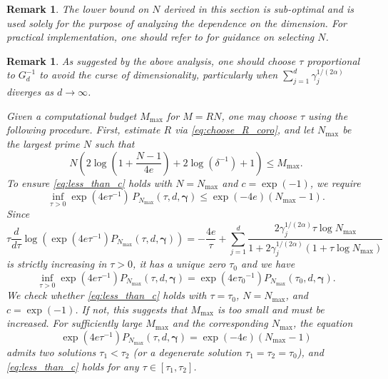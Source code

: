 \documentclass[pdflatex,sn-basic,Numbered]{sn-jnl}%
\newcommand{\bsgamma}{\boldsymbol{\gamma}}
\theoremstyle{thmstyleone}%
\newtheorem{remark}[theorem]{Remark}
\theoremstyle{thmstyletwo}%
\begin{document}
\begin{remark}
    The lower bound on $N$ derived in this section is sub-optimal and is used solely for the purpose of analyzing the dependence on the dimension. For practical implementation, one should refer to  for guidance on selecting $N$.
\end{remark}


\begin{remark}\label{rmk:choosingtau}
    As suggested by the above analysis, one should choose $\tau$ proportional to $G_d^{-1}$ to avoid the curse of dimensionality, particularly when $\sum_{j=1}^d \gamma_j^{1/(2\alpha)}$ diverges as $d \to \infty$.

    Given a computational budget $M_{\max}$ for $M = RN$, one may choose $\tau$ using the following procedure. First, estimate $R$ via \eqref{eq:choose_R_coro}, and let $N_{\max}$ be the largest prime $N$ such that
    \begin{equation}\label{eq:maximum_prime}
    N\left(2\log \left(1 + \frac{N-1}{4e}\right)+2\log(\delta^{-1})+1\right)\leq M_{\max}.
    \end{equation}
    To ensure \eqref{eq:less_than_c} holds with $N = N_{\max}$ and $c = \exp(-1)$, we require
    \[ 
    \inf_{\tau>0}\exp \left(4e\tau^{-1}\right)\,P_{N_{\max}} (\tau,d,\bsgamma)\leq \exp(-4e)\left(N_{\max}-1\right).
    \]
    Since
    \begin{equation}\label{eq:logderiative1}
        \tau\frac{d}{d\tau}\log\left(\exp \left(4e\tau^{-1}\right)P_{N_{\max}} (\tau,d,\bsgamma)\right)=-\frac{4e}{\tau}+\sum_{j=1}^d \frac{2\gamma_j^{1/(2\alpha)}\tau \log N_{\max} }{1+ 2\gamma_j^{1/(2\alpha)} (1+\tau\log N_{\max})}
    \end{equation}
    is strictly increasing in $\tau>0$, it has a unique zero $\tau_0$ and we have
    \[ 
    \inf_{\tau>0}\exp \left(4e\tau^{-1}\right)P_{N_{\max}} (\tau,d,\bsgamma)=\exp \left(4e{\tau_0}^{-1}\right)P_{N_{\max}} (\tau_0,d,\bsgamma).
    \]
    We check whether \eqref{eq:less_than_c} holds with $\tau = \tau_0$, $N = N_{\max}$, and $c = \exp(-1)$. If not, this suggests that $M_{\max}$ is too small and must be increased.
    For sufficiently large $M_{\max}$ and the corresponding $N_{\max}$, the equation
    \begin{equation*}
     \exp \left(4e\tau^{-1}\right) P_{N_{\max}} (\tau,d,\bsgamma)=\exp(-4e)\left(N_{\max}-1\right)   
    \end{equation*}
    admits two solutions $\tau_1 < \tau_2$ (or a degenerate solution $\tau_1 = \tau_2 = \tau_0$), and \eqref{eq:less_than_c} holds for any $\tau \in [\tau_1, \tau_2]$.
    

\end{remark}
\end{document}
